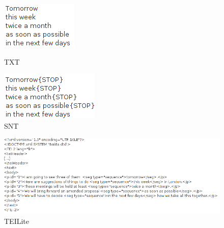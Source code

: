 \begin{figure}[h!]
	\begin{minipage}[h!]{0.5\linewidth}
		\centering
		\includegraphics[scale=0.6]{resources/img/fig8-1tomorrow.png}	
		\caption{TXT\label{fig8-1CorpusTxt}}
		\label{fig7-TXT}
	\end{minipage}
	\hspace{0.1cm}
	\begin{minipage}[h!]{0.5\linewidth}
		\centering
		\includegraphics[scale=0.6]{resources/img/fig8-2tomorrowSNT.png}
		\caption{SNT\label{fig8-2CorpusSNT}}
	\end{minipage}
	\hspace{0.1cm}
\end{figure}
\begin{figure}[h!]
	\begin{minipage}[h!]{\linewidth}
		\centering
			\includegraphics[width=14cm]{resources/img/fig8-3tomorrowTEI.png}
			\caption{TEILite\label{fig8-3CorpusTEI}}
	\end{minipage}
\end{figure}
